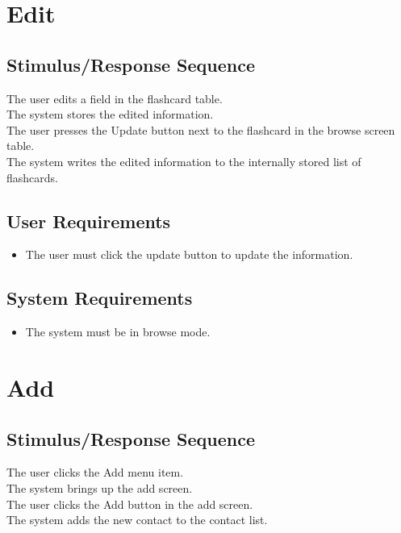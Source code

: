 \documentclass{scrreprt}
\newcommand{\smallspace}{\vspace{0.5cm}}
\begin{document}
\section{Edit}
    \subsection*{Stimulus/Response Sequence}
        \begin{flushleft}
             The user edits a field in the flashcard table. \\
             The system stores the edited information. \\
            \smallspace
             The user presses the Update button next to the flashcard in the browse screen table. \\
             The system writes the edited information to the internally stored list of flashcards. \\
        \end{flushleft}
    \subsection*{User Requirements}
        \begin{itemize}
            \item The user must click the update button to update the information.
        \end{itemize}

    \subsection*{System Requirements}
        \begin{itemize}
            \item The system must be in browse mode.
        \end{itemize}

\section{Add}
    \subsection*{Stimulus/Response Sequence}
        \begin{flushleft}
             The user clicks the Add menu item. \\
             The system brings up the add screen. \\
            \smallspace
             The user clicks the Add button in the add screen. \\
             The system adds the new contact to the contact list. \\
        \end{flushleft}
\end{document}
